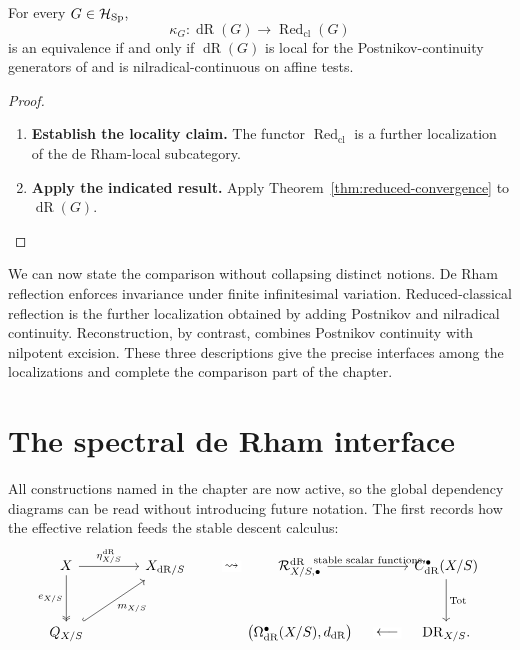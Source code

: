 \begin{corollary}
\label{cor:invertibility-reduced-comparison}
For every \(G\in\mathcal H_{\operatorname{Sp}}\),
\[
  \kappa_G:\operatorname{dR}(G)\longrightarrow \operatorname{Red}_{\mathrm{cl}}(G)
\]
is an equivalence if and only if \(\operatorname{dR}(G)\) is local for the
Postnikov-continuity generators of
 and is
nilradical-continuous on affine tests.
\end{corollary}

\begin{proof}
\leavevmode
\begin{enumerate}[label=\textup{(\arabic*)}]
    \item \textbf{Establish the locality claim.}
    The functor \(\operatorname{Red}_{\mathrm{cl}}\) is a further localization of the de Rham-local
    subcategory.
    \item \textbf{Apply the indicated result.}
    Apply Theorem~\ref{thm:reduced-convergence} to
    \(\operatorname{dR}(G)\).
\end{enumerate}
\end{proof}


We can now state the comparison without collapsing distinct notions.
De Rham reflection enforces invariance under finite infinitesimal variation.
Reduced-classical reflection is the further localization obtained by adding
Postnikov and nilradical continuity. Reconstruction, by contrast, combines
Postnikov continuity with nilpotent excision. These three descriptions give
the precise interfaces among the localizations and complete the comparison
part of the chapter.
\section{The spectral de Rham interface}
\label{sec:de-Rham-construction}

All constructions named in the chapter are now active, so the global
dependency diagrams can be read without introducing future notation. The
first records how the effective relation feeds the stable descent calculus:
\[
\begin{tikzcd}[column sep=large,row sep=large]
  X
    \arrow[r,"\eta_{X/S}^{\mathrm{dR}}"]
    \arrow[d,two heads,"e_{X/S}"']
  &
  X_{\mathrm{dR}/S}
  &
  \mathcal R^{\mathrm{dR}}_{X/S,\bullet}
    \arrow[l,phantom,"\leadsto" description]
    \arrow[r,"\text{stable scalar functions}"]
  &
  C^\bullet_{\mathrm{dR}}(X/S)
    \arrow[d,"\operatorname*{Tot}"]
  \\
  Q_{X/S}
    \arrow[ur,hook,"m_{X/S}"']
  &&
  \bigl(\Omega^\bullet_{\mathrm{dR}}(X/S),d_{\mathrm{dR}}\bigr)
    \arrow[r,phantom,"\longleftarrow" description]
  &
  \mathrm{DR}_{X/S}.
\end{tikzcd}
\]

